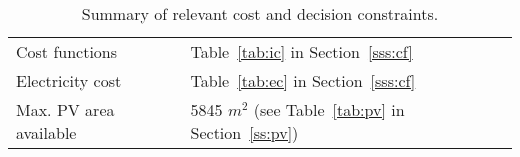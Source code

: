 \begin{table}[htp]
	\centering
	\caption{Summary of relevant cost and decision constraints.}
	\label{tab:cc_sa}
	\begin{tabular}{ll}
		\toprule
		Cost functions         & Table~\ref{tab:ic} in Section~\ref{sss:cf}         \\
		Electricity cost       & Table~\ref{tab:ec} in Section~\ref{sss:cf}       \\
		Max. PV area available & 5845 $m^2$ (see Table~\ref{tab:pv} in Section~\ref{ss:pv})\\ 
		\bottomrule
	\end{tabular}
\end{table}